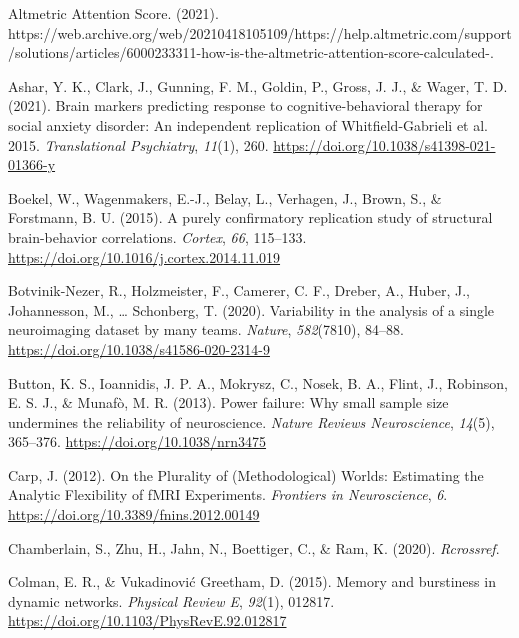 \documentclass[
  man,floatsintext]{apa6}
\newlength{\cslhangindent}
\newlength{\cslentryspacingunit} %
\newenvironment{CSLReferences}[2] %
 {%
  \setlength{\parindent}{0pt}
  \ifodd #1
  \let\oldpar\par
  \def\par{\hangindent=\cslhangindent\oldpar}
  \fi
  \setlength{\parskip}{#2\cslentryspacingunit}
 }%
 {}
\begin{document}
\hypertarget{refs}{}
\begin{CSLReferences}{1}{0}
\leavevmode{}%
Altmetric {Attention Score}. (2021). https://web.archive.org/web/20210418105109/https://help.altmetric.com/support/solutions/articles/6000233311-how-is-the-altmetric-attention-score-calculated-.

\leavevmode{}%
Ashar, Y. K., Clark, J., Gunning, F. M., Goldin, P., Gross, J. J., \& Wager, T. D. (2021). Brain markers predicting response to cognitive-behavioral therapy for social anxiety disorder: An independent replication of {Whitfield}-{Gabrieli} et al. 2015. \emph{Translational Psychiatry}, \emph{11}(1), 260. \url{https://doi.org/10.1038/s41398-021-01366-y}

\leavevmode{}%
Boekel, W., Wagenmakers, E.-J., Belay, L., Verhagen, J., Brown, S., \& Forstmann, B. U. (2015). A purely confirmatory replication study of structural brain-behavior correlations. \emph{Cortex}, \emph{66}, 115--133. \url{https://doi.org/10.1016/j.cortex.2014.11.019}

\leavevmode{}%
Botvinik-Nezer, R., Holzmeister, F., Camerer, C. F., Dreber, A., Huber, J., Johannesson, M., \ldots{} Schonberg, T. (2020). Variability in the analysis of a single neuroimaging dataset by many teams. \emph{Nature}, \emph{582}(7810), 84--88. \url{https://doi.org/10.1038/s41586-020-2314-9}

\leavevmode{}%
Button, K. S., Ioannidis, J. P. A., Mokrysz, C., Nosek, B. A., Flint, J., Robinson, E. S. J., \& Munafò, M. R. (2013). Power failure: Why small sample size undermines the reliability of neuroscience. \emph{Nature Reviews Neuroscience}, \emph{14}(5), 365--376. \url{https://doi.org/10.1038/nrn3475}

\leavevmode{}%
Carp, J. (2012). On the {Plurality} of ({Methodological}) {Worlds}: {Estimating} the {Analytic Flexibility} of {fMRI Experiments}. \emph{Frontiers in Neuroscience}, \emph{6}. \url{https://doi.org/10.3389/fnins.2012.00149}

\leavevmode{}%
Chamberlain, S., Zhu, H., Jahn, N., Boettiger, C., \& Ram, K. (2020). \emph{Rcrossref}.

\leavevmode{}%
Colman, E. R., \& Vukadinović Greetham, D. (2015). Memory and burstiness in dynamic networks. \emph{Physical Review E}, \emph{92}(1), 012817. \url{https://doi.org/10.1103/PhysRevE.92.012817}


\end{CSLReferences}
\end{document}
